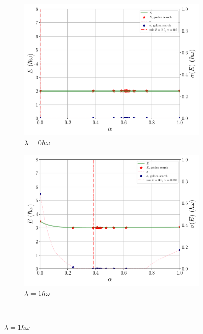 \documentclass[a4paper,DIV=12,english]{scrartcl}
\begin{document}
\begin{figure}
    \centering
    \begin{subfigure}{0.49\textwidth}
        \centering
        \includegraphics[width=\textwidth]{../plots/summary/summary_2d_lambda0.pdf}
        \caption{$\lambda=0\hbar\omega$}
        \label{subfig:summary_lambda0}
    \end{subfigure}
    \begin{subfigure}{0.49\textwidth}
        \centering
        \includegraphics[width=\textwidth]{../plots/summary/summary_2d_lambda1.pdf}
        \caption{$\lambda=1\hbar\omega$}
        \label{subfig:summary_lambda1}
    \end{subfigure}\\

\end{figure}
\end{document}
